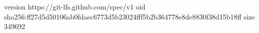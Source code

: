 version https://git-lfs.github.com/spec/v1
oid sha256:ff27d5d50106ab0fdaec6773d5b23024fff5b2b364778e8de8830f38d15b18ff
size 349692
